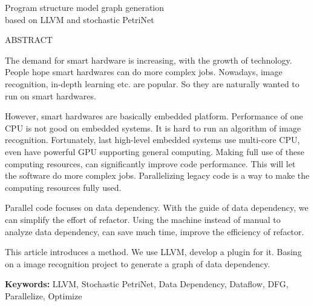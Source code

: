 
\begin{center}
    \LARGE{\vspace*{0.3em}}
    \LARGE{Program structure model graph generation \\ based on LLVM and stochastic PetriNet}
    \LARGE{\vspace{1em}}

    \Large{ABSTRACT}
\end{center}

The demand for smart hardware is increasing, with the growth of technology.
People hope smart hardwares can do more complex jobs.
Nowadays, image recognition, in-depth learning etc. are popular.
So they are naturally wanted to run on smart hardwares.

However, smart hardwares are basically embedded platform.
Performance of one CPU is not good on embedded systems.
It is hard to run an algorithm of image recognition.
Fortunately, last high-level embedded systems use multi-core CPU,
even have powerful GPU supporting general computing.
Making full use of these computing resources, can significantly improve code performance.
This will let the software do more complex jobs.
Parallelizing legacy code is a way to make the computing resources fully used.

Parallel code focuses on data dependency.
With the guide of data dependency, we can simplify the effort of refactor.
Using the machine instead of manual to analyze data dependency,
can save much time, improve the efficiency of refactor.

This article introduces a method.
We use LLVM, develop a plugin for it.
Basing on a image recognition project to generate a graph of data dependency.

\vspace{1em}

\textbf{Keywords: }\textnormal{LLVM, Stochastic PetriNet, Data Dependency, Dataflow, DFG, Parallelize, Optimize}
